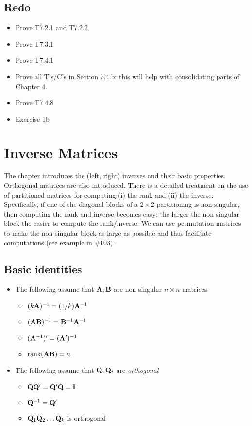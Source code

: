 \documentclass[a4paper, oneside]{book}
\begin{document}
\section*{Redo}
\begin{itemize}
\item Prove T7.2.1 and T7.2.2
\item Prove T7.3.1
\item Prove T7.4.1
\item Prove all T's/C's in Section 7.4.b: this will help with consolidating parts of Chapter 4.
\item Prove T7.4.8
\item Exercise 1b
\end{itemize}




\chapter{Inverse Matrices}
The chapter introduces the (left, right) inverses and their basic properties. Orthogonal matrices are also introduced. There is a detailed treatment on the use of partitioned matrices for computing (i) the rank and (ii) the inverse. Specifically, if one of the diagonal blocks of a $2\times 2$ partitioning is non-singular, then computing the rank and inverse becomes easy; the larger the non-singular block the easier to compute the rank/inverse. We can use permutation matrices to make the non-singular block as large as possible and thus facilitate computations (see example in \#103).


\section*{Basic identities}
\begin{itemize}
\item The following assume that $\mathbf{A,B}$ are non-singular $n\times n$ matrices
	\begin{itemize}
	\item $(k\mathbf A)^{-1}=(1/k)\mathbf A^{-1}$
	\item $(\mathbf{AB})^{-1}=\mathbf{B}^{-1} \mathbf{A}^{-1}$ 
	\item $(\mathbf A^{-1})' = (\mathbf A')^{-1}$
	\item $\text{rank}(\mathbf{AB}) = n$
	\end{itemize}
\item The following assume that $\mathbf Q, \mathbf Q_i$ are \textit{orthogonal}
	\begin{itemize}
	\item $\mathbf{Q}\mathbf{Q}'=\mathbf{Q}'\mathbf{Q}=\mathbf I$
	\item $\mathbf{Q}^{-1}=\mathbf{Q}'$
	\item $\mathbf{Q}_1\mathbf{Q}_2\hdots\mathbf{Q}_k$ is orthogonal
	\end{itemize}
\end{itemize}
\end{document}
